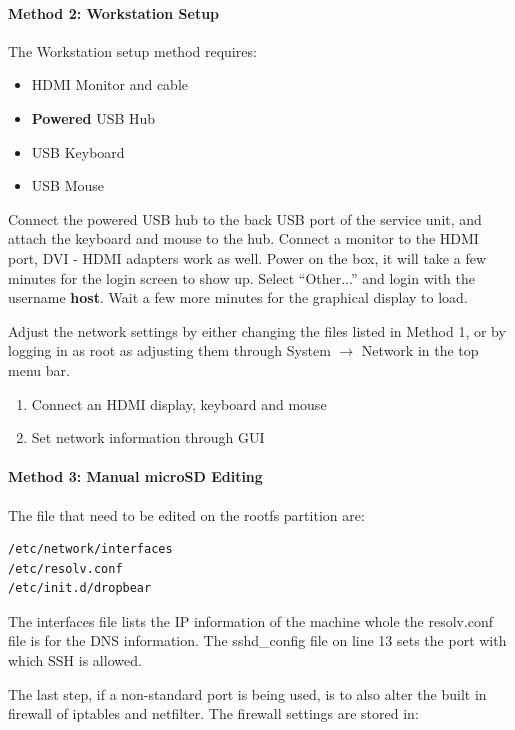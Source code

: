 \paragraph{Method 2: Workstation Setup}
The Workstation setup method requires:
\begin{itemize}
\item{HDMI Monitor and cable}
\item{{\bf Powered} USB Hub}
\item{USB Keyboard}
\item{USB Mouse}
\end{itemize}

Connect the powered USB hub to the back USB port of the service unit, and attach the keyboard and mouse to the hub.
Connect a monitor to the HDMI port, DVI - HDMI adapters work as well.
Power on the box, it will take a few minutes for the login screen to show up.
Select ``Other...'' and login with the username \textbf{host}.
Wait a few more minutes for the graphical display to load.

Adjust the network settings by either changing the files listed in Method 1, or by logging in as root as adjusting them through System $\rightarrow$ Network in the top menu bar.

\begin{enumerate}
\item{Connect an HDMI display, keyboard and mouse}
\item{Set network information through GUI}
\end{enumerate}


\paragraph{Method 3: Manual microSD Editing}

The file that need to be edited on the rootfs partition are:

\begin{verbatim}
/etc/network/interfaces
/etc/resolv.conf
/etc/init.d/dropbear
\end{verbatim}

The interfaces file lists the IP information of the machine whole the resolv.conf file is for the DNS information.
The sshd\_config file on line 13 sets the port with which SSH is allowed.

The last step, if a non-standard port is being used, is to also alter the built in firewall of iptables and netfilter.
The firewall settings are stored in:

